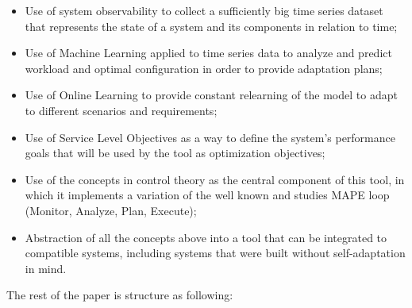 \begin{itemize}
  \item Use of system observability to collect a sufficiently big time series dataset that represents the state of a system and its components in relation to time;
  \item Use of Machine Learning applied to time series data to analyze and predict workload and optimal configuration in order to provide adaptation plans;
  \item Use of Online Learning to provide constant relearning of the model to adapt to different scenarios and requirements;
  \item Use of Service Level Objectives as a way to define the system's performance goals that will be used by the tool as optimization objectives;
  \item Use of the concepts in control theory as the central component of this tool, in which it implements a variation of the well known and studies MAPE loop (Monitor, Analyze, Plan, Execute);
  \item Abstraction of all the concepts above into a tool that can be integrated to compatible systems, including systems that were built without self-adaptation in mind. 
\end{itemize}

The rest of the paper is structure as following: 





